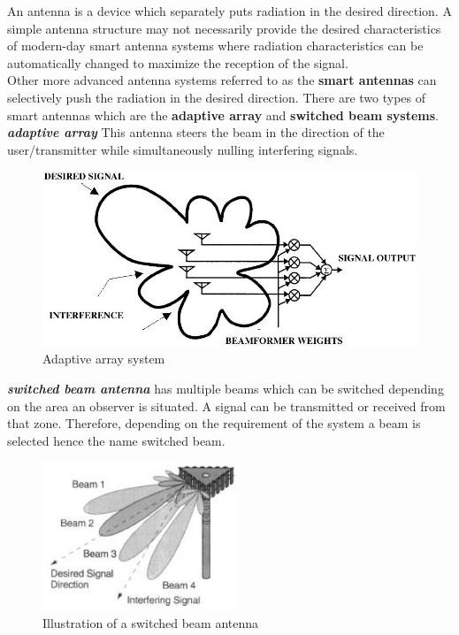 An antenna is a device which separately puts radiation in the desired direction. A simple antenna structure may not necessarily provide the desired characteristics of modern-day smart antenna systems where radiation characteristics can be automatically changed to maximize the reception of the signal.\\

Other more advanced antenna systems referred to as the \textbf{smart antennas} can selectively push the radiation in the desired direction. There are two types of smart antennas which are the \textbf{adaptive array} and \textbf{switched beam systems}.\\

\textit{\textbf{adaptive array}}
This antenna steers the beam in the direction of the user/transmitter while simultaneously nulling interfering signals.
\begin{figure}[h]
\centering
\includegraphics[scale=0.3]{./graphics/fh06_02}
\caption{Adaptive array system}
\end{figure}

\textit{\textbf{switched beam antenna}} has multiple beams which can be switched depending on the area an observer is situated. A signal can be transmitted or received from that zone. Therefore, depending on the requirement of the system a beam is selected hence the name switched beam.
\begin{figure}[h]
\centering
\includegraphics[scale=0.7]{./graphics/switchedbeam}
\caption{Illustration of a switched beam antenna}
\end{figure} 

